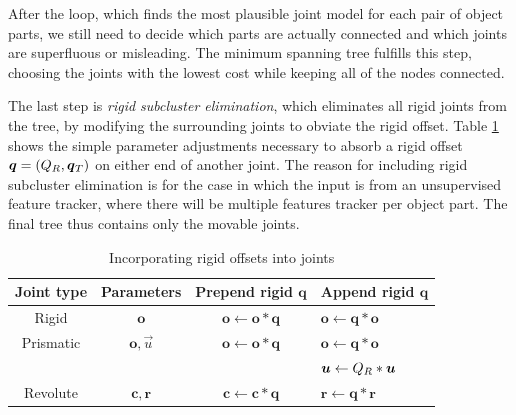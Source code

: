 \documentclass[a4paper,orivec]{llncs}
\def\xmat{\uppercase}    \def\xmatstr{in uppercase}
\def\xvec{\vec}          \def\xvecstr{with an arrow}
\def\xse{\bm}            \def\xsestr{in boldface}
\begin{document}
After the loop, which finds the most plausible joint model for each pair of object parts, we still need to decide which parts are actually connected and which joints are superfluous or misleading. The minimum spanning tree fulfills this step, choosing the joints with the lowest cost while keeping all of the nodes connected.

The last step is \emph{rigid subcluster elimination}, which eliminates all rigid joints from the tree, by modifying the surrounding joints to obviate the rigid offset. Table \ref{tbl:move} shows the simple parameter adjustments necessary to absorb a rigid offset $\xse{q} = (\xmat{q}_R, \xvec{q}_T)$ on either end of another joint. The reason for including rigid subcluster elimination is for the case in which the input is from an unsupervised feature tracker, where there will be multiple features tracker per object part. The final tree thus contains only the movable joints.

\begin{table}[ht]
  \vspace{-.3in}
  \centering
  \begin{tabular}{c|c|c|l}
    Joint type & Parameters & Prepend rigid $\xse{q}$ & Append rigid $\xse{q}$ \\
    \hline
    Rigid & $\xse{o}$ & $\xse{o} \leftarrow \xse{o}*\xse{q}$ & $\xse{o} \leftarrow \xse{q}*\xse{o}$ \\
    Prismatic & $\xse{o}, \xvec{u}$ & $\xse{o} \leftarrow \xse{o}*\xse{q}$ & $\xse{o} \leftarrow \xse{q}*\xse{o}$ \\&&& $\xvec{u} \leftarrow \xmat{q}_R*\xvec{u}$ \\
    Revolute & $\xse{c}, \xse{r}$ & $\xse{c} \leftarrow \xse{c}*\xse{q}$ & $\xse{r} \leftarrow \xse{q}*\xse{r}$ \\
  \end{tabular}
  \vspace{0.1in}
  \caption{Incorporating rigid offsets into joints}
  \label{tbl:move}
  \vspace{-.3in}
\end{table}
\end{document}
